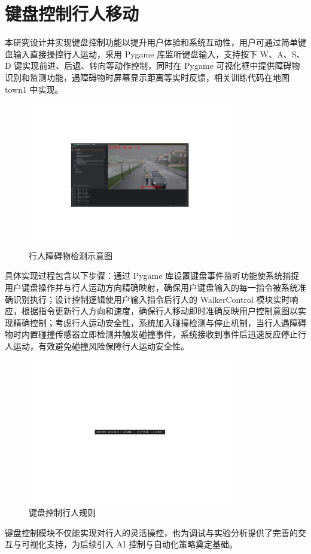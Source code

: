 \section{键盘控制行人移动}
本研究设计并实现键盘控制功能以提升用户体验和系统互动性，用户可通过简单键盘输入直接操控行人运动，采用 Pygame 库监听键盘输入，支持按下 W、A、S、D 键实现前进、后退、转向等动作控制，同时在 Pygame 可视化框中提供障碍物识别和监测功能，遇障碍物时屏幕显示距离等实时反馈，相关训练代码在地图 town1 中实现。

\begin{figure}[H]
    \centering
    \includegraphics[width=0.8\textwidth]{images/collision_detection.pdf}
    \caption{行人障碍物检测示意图}
    \label{f.collision_detection}
\end{figure}

具体实现过程包含以下步骤：通过 Pygame 库设置键盘事件监听功能使系统捕捉用户键盘操作并与行人运动方向精确映射，确保用户键盘输入的每一指令被系统准确识别执行；设计控制逻辑使用户输入指令后行人的 WalkerControl 模块实时响应，根据指令更新行人方向和速度，确保行人移动即时准确反映用户控制意图以实现精确控制；考虑行人运动安全性，系统加入碰撞检测与停止机制，当行人遇障碍物时内置碰撞传感器立即检测并触发碰撞事件，系统接收到事件后迅速反应停止行人运动，有效避免碰撞风险保障行人运动安全性。

\begin{figure}[H]
    \centering
    \includegraphics[width=0.8\textwidth]{images/keyboard_control.pdf}
    \caption{键盘控制行人规则}
    \label{f.keyboard_control}
\end{figure}

键盘控制模块不仅能实现对行人的灵活操控，也为调试与实验分析提供了完善的交互与可视化支持，为后续引入 AI 控制与自动化策略奠定基础。
